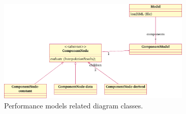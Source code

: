 \begin{figure}
  \centering
  \includegraphics[width=0.825\textwidth]{figures/user-guide/tool-design-interpolate-model.pdf}
  \caption{Performance models related diagram classes.}
  \label{fig:tool_design_interpolate_model}
\end{figure}
